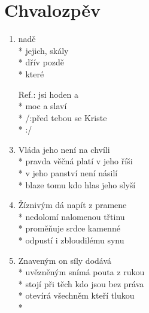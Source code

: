 \section{Chvalozpěv}
\begin{enumerate}
\item {}  nadě \\*
 jejich,  skály    \\*
 dřív  pozdě \\*
  které   
\item[Ref.:]  jsi hoden  a   \\*
 moc a  slaví  \\*
/:před tebou se  Kriste   \\*
   :/
\item Vláda jeho není na chvíli \\*
pravda věčná platí v jeho říši \\*
v jeho panství není násilí \\*
blaze tomu kdo hlas jeho slyší 
\item Žíznivým dá napít z pramene \\*
nedolomí nalomenou třtinu \\*
proměňuje srdce kamenné \\*
odpustí i zbloudilému synu 
\item Znaveným on síly dodává \\*
uvězněným snímá pouta z rukou \\*
stojí při těch kdo jsou bez práva \\*
otevírá všechněm kteří tlukou \\*
\end{enumerate}
